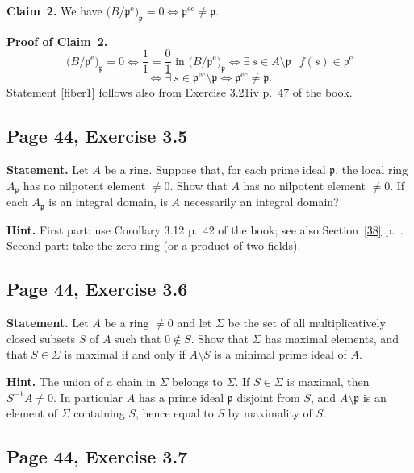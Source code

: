 \documentclass[parskip=half,fontsize=12pt]{scrartcl}%
\newcommand{\oo}{\operatorname}\newcommand{\ooo}{\operatorname*}
\newcommand{\mf}{\mathfrak}
\newcommand{\ppp}{\mf p}
\begin{document}
\textbf{Claim~2.} We have $\big(B/\ppp^{\oo e}\big)_\ppp=0\iff\ppp^{\oo{ec}}\ne\ppp$. 

\textbf{Proof of Claim~2.} 
$$
\big(B/\ppp^{\oo e}\big)_\ppp=0\iff\frac11=\frac01\text{ in }\big(B/\ppp^{\oo e}\big)_\ppp\iff\exists\ s\in A\setminus\ppp\ |\ f(s)\in\ppp^{\oo e}
$$ 
$$
\iff\exists\ s\in\ppp^{\oo{ec}}\setminus\ppp\iff\ppp^{\oo{ec}}\ne\ppp.
$$ 
Statement \eqref{fiber1} follows also from Exercise 3.21iv p.~47 of the book.


\subsection{Page 44, Exercise 3.5}%

\textbf{Statement.} Let $A$ be a ring. Suppose that, for each prime ideal $\ppp$, the local ring $A_\ppp$ has no nilpotent element $\ne0$. Show that $A$ has no nilpotent element $\ne0$. If each $A_\ppp$ is an integral domain, is $A$ necessarily an integral domain?

\textbf{Hint.} First part: use Corollary 3.12 p.~42 of the book; see also Section~\ref{38} p.~\pageref{38}. Second part: take the zero ring (or a product of two fields).

\subsection{Page 44, Exercise 3.6}%

\textbf{Statement.} Let $A$ be a ring $\ne0$ and let $\Sigma$ be the set of all multiplicatively closed subsets $S$ of $A$ such that $0\notin S$. Show that $\Sigma$ has maximal elements, and that $S\in\Sigma$ is maximal if and only if $A\setminus S$ is a minimal prime ideal of $A$.

\textbf{Hint.} The union of a chain in $\Sigma$ belongs to $\Sigma$. If $S\in\Sigma$ is maximal, then $S^{-1}A\ne0$. In particular $A$ has a prime ideal $\ppp$ disjoint from $S$, and $A\setminus\ppp$ is an element of $\Sigma$ containing $S$, hence equal to $S$ by maximality of $S$.

\subsection{Page 44, Exercise 3.7}%
\end{document}
